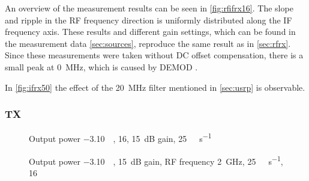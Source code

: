 \documentclass[12pt,a4paper,parskip=full]{scrartcl}
\begin{document}
An overview of the measurement results can be seen in \cref{fig:rfifrx16}. The slope and ripple
in the RF frequency direction is uniformly distributed along the IF frequency axis.
These results and different gain settings, which can be found in the measurement data \ref{sec:sources},
reproduce the same result as in \cref{sec:rfrx}. Since these measurements were taken without DC offset
compensation, there is a small peak at \SI{0}{\mega\hertz}, which is caused by DEMOD \cite{demod}.

In \ref{fig:ifrx50} the effect of the \SI{20}{\mega\hertz} filter mentioned in \cref{sec:usrp} is
observable.

\subsubsection{TX}
\label{sec:iftx}
\begin{figure}[htb]
    \centering
{}
    \caption{Output power \SI{-3.10}{\deci\belfs}, \SI{16}{\bit}, \SI{15}{\deci\bel} gain, \SI{25}{\mega\samples\per\second}}
    \label{fig:rfiftx16}
\end{figure}
\begin{figure}[htb]
    \centering
{}
    \caption{Output power \SI{-3.10}{\deci\belfs}, \SI{15}{\deci\bel} gain, RF frequency \SI{2}{\giga\hertz}, \SI{25}{\mega\samples\per\second}, \SI{16}{\bit}}
    \label{fig:iftx}
\end{figure}
\end{document}
